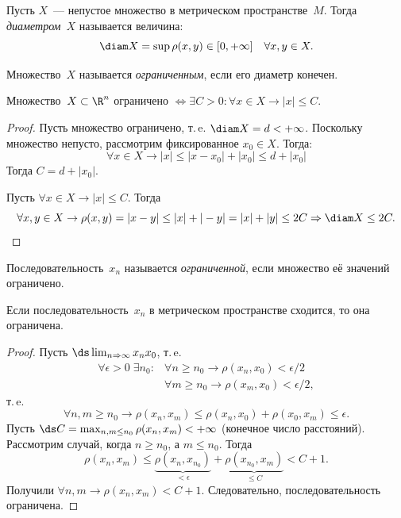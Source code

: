 \begin{definition}
Пусть \(X\)~--- непустое множество в метрическом пространстве~\(M\). Тогда
\textit{диаметром}~\(X\) называется величина:
\[
    \diam X = \sup \rho(x, y) \in [0, +\infty] \quad \forall x, y \in X.
\]
\end{definition}

\begin{definition}
Множество~\(X\) называется \textit{ограниченным}, если его диаметр конечен.
\end{definition}

\begin{statement}
Множество~\(X \subset \R^n\) ограничено \(\Longleftrightarrow \exists C > 0
\colon \forall x \in X \rightarrow |x| \leq C\).
\end{statement}

\begin{proof}
\Boxedrightarrow Пусть множество ограничено, т.\,e. \(\diam X = d < +\infty\).
Поскольку множество непусто, рассмотрим фиксированное \(x_0 \in X\). Тогда:
\[
    \forall x \in X \rightarrow |x| \leq |x - x_0| + |x_0| \leq d + |x_0|
\]
Тогда \(C = d + |x_0|\).

\Boxedleftarrow Пусть \(\forall x \in X \rightarrow |x| \leq C\). Тогда
\[
    \forall x, y \in X \rightarrow \rho(x, y) = |x - y| \leq |x| + |-y| = |x| +
        |y| \leq 2C \Rightarrow \diam X \leq 2C.
\]
\end{proof}

\begin{definition}
Последовательность~\(x_n\) называется \textit{ограниченной}, если множество её
значений ограничено.
\end{definition}

\begin{statement}
Если последовательность~\(x_n\) в метрическом пространстве сходится, то она
ограничена.
\end{statement}

\begin{proof}
Пусть \(\ds\lim_{n \Rightarrow \infty} x_n x_0\), т.\,e.
\begin{align}
    \forall \epsilon > 0 \;\exists n_0 \colon &\forall n \geq n_0 \rightarrow
        \rho(x_n, x_0) < \epsilon / 2\\
    &\forall m \geq n_0 \rightarrow \rho(x_m, x_0) < \epsilon / 2,
\end{align}
т.\,e.
\[
    \forall n, m \geq n_0 \rightarrow \rho(x_n, x_m) \leq \rho(x_n, x_0) +
        \rho(x_0, x_m) \leq \epsilon.
\]
Пусть \(\ds C = \max_{n, m \leq n_0} \rho(x_n, x_m) < +\infty\) (конечное число
расстояний). Рассмотрим случай, когда \(n \geq n_0\), а \(m \leq n_0\). Тогда
\[
    \rho(x_n, x_m) \leq \underbrace{\rho(x_n, x_{n_0})}_{< \epsilon} +
        \underbrace{\rho(x_{n_0}, x_m)}_{\leq C} < C + 1.
\]
Получили \(\forall n, m \rightarrow \rho(x_n, x_m) < C + 1\). Следовательно,
последовательность ограничена.
\end{proof}

